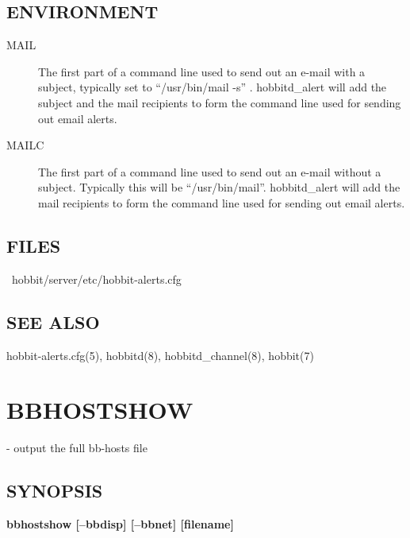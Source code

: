  


 
\subsection{ENVIRONMENT}
\begin{description}
\item[MAIL] The first part of a command line used to send out an
  e-mail with a subject, typically set to ``/usr/bin/mail -s''
  . hobbitd\_alert will add the subject and the mail recipients to
  form the command line used for sending out email alerts. 


 

\item[MAILC] The first part of a command line used to send out an
  e-mail without a subject. Typically this will be
  ``/usr/bin/mail''. hobbitd\_alert will add the mail recipients to
  form the command line used for sending out email alerts. 


 
\end{description}
\subsection{FILES}
\begin{description}
\item[~hobbit/server/etc/hobbit-alerts.cfg]


\end{description}
\subsection{SEE ALSO}
hobbit-alerts.cfg(5), hobbitd(8), hobbitd\_channel(8), hobbit(7) 

 
%
\newpage
\section{BBHOSTSHOW}
  - output the full bb-hosts file 

\subsection{SYNOPSIS}
\textbf{bbhostshow [--bbdisp] [--bbnet] [filename]}


